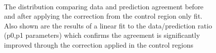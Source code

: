 \begin{figure}[tbhp]
\begin{center}
        \\
        \caption{The \mht distribution comparing data and prediction agreement before and after applying the correction from the control region only fit. Also shown are the results of a linear fit to the data/prediction ratio (p0,p1 parameters) which confirms the agreement is significantly improved through the correction applied in the control regions}
    \end{center}
\end{figure}
